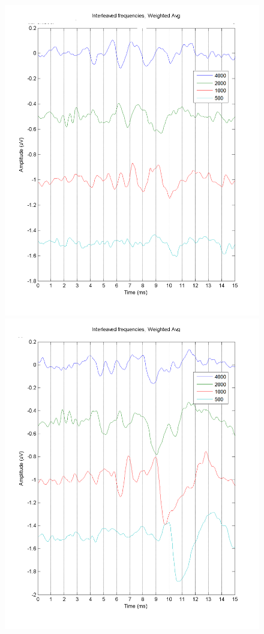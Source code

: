 \begin{figure}[H]
    \begin{minipage}{0.48\textwidth}
        \includegraphics[width=\textwidth]{images/Interleaved75dbGHINOMA-3.png}
    \end{minipage}
    \hfill
    \begin{minipage}{0.48\textwidth}
        \includegraphics[width=\textwidth]{images/Interleaved75dbGHINOMA-4.png}

\end{minipage}
\end{figure}
